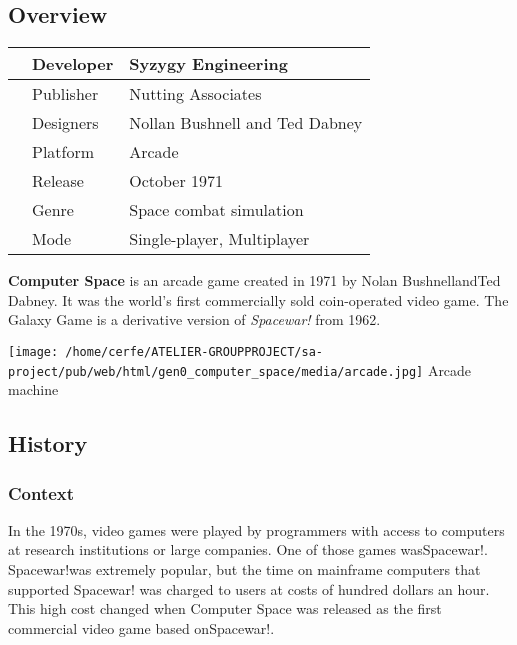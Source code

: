 \documentclass[a4paper,10pt]{book}
\begin{document}
 \subsection{Overview }
 \begin{longtable}{p{1mm}|l|l|}\hline
 
 & Developer 
 & Syzygy Engineering 
 \\\hline
 
 & Publisher 
 & Nutting Associates 
 \\\hline
 
 & Designers 
 & Nollan Bushnell and Ted Dabney 
 \\\hline
 
 & Platform 
 & Arcade 
 \\\hline
 
 & Release 
 & October 1971 
 \\\hline
 
 & Genre 
 & Space combat simulation 
 \\\hline
 
 & Mode 
 & Single-player, Multiplayer 
 \\\hline
 \end{longtable}
 
 
 \textbf{Computer Space }  is an arcade game created in 1971 by Nolan BushnellandTed Dabney.
          It was the world's first commercially sold coin-operated video game. 
          The Galaxy Game is a derivative version of  \textit{Spacewar! } from 1962. 
 
 
 
 \texttt{[image: /home/cerfe/ATELIER-GROUPPROJECT/sa-project/pub/web/html/gen0\_computer\_space/media/arcade.jpg]}
 Arcade machine 
 
 \subsection{History }
 \subsubsection{Context }
 
            In the 1970s, video games were played by programmers with access to computers at research institutions or large companies. One of those games wasSpacewar!. 
            Spacewar!was extremely popular, but the time on mainframe computers that supported Spacewar! was charged to users at costs of hundred dollars an hour.  
            This high cost changed when Computer Space was released as the first commercial video game based onSpacewar!. 
 
\end{document}
